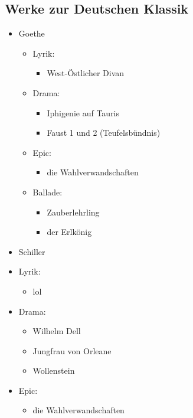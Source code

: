 \documentclass[12pt,a4paper]{article}
\begin{document}
\subsection{Werke zur Deutschen Klassik}

\begin{itemize}

\item Goethe
	\begin{itemize}
		\item Lyrik:
			\begin{itemize}
			\item West-Östlicher Divan
			\end{itemize}					
				
		\item Drama:
			\begin{itemize}
			\item Iphigenie auf Tauris
			\item Faust 1 und 2 (Teufelsbündnis)
			\end{itemize}
			
		\item Epic:
			\begin{itemize}
			\item die Wahlverwandschaften
			\end{itemize}
			
		\item Ballade:
			\begin{itemize}
			\item Zauberlehrling
			\item der Erlkönig
			\end{itemize}
	
	\end{itemize}
	
\item Schiller
		\item Lyrik:
			\begin{itemize}
			\item lol
			\end{itemize}					
				
		\item Drama:
			\begin{itemize}
			\item Wilhelm Dell
			\item Jungfrau von Orleane
			\item Wollenstein
			\end{itemize}
			
		\item Epic:
			\begin{itemize}
			\item die Wahlverwandschaften
			\end{itemize}
		

\end{itemize}
\end{document}
